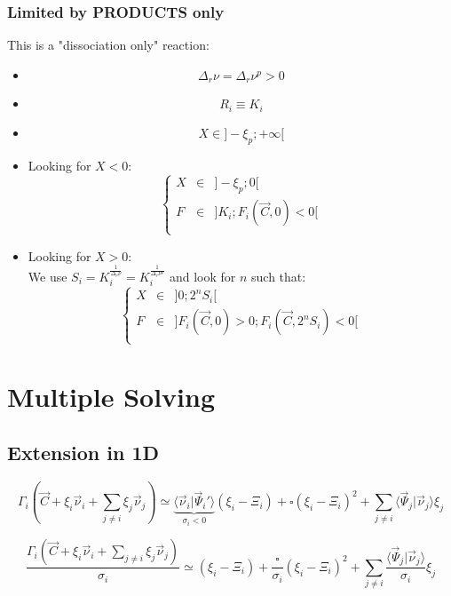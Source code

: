 \documentclass[aps,12pt]{revtex4}
\begin{document}
\subsubsection{Limited by PRODUCTS only}
This is a "dissociation only" reaction:
\begin{itemize}
\item
$$
	\Delta_r \nu =  \Delta_r \nu^p > 0 
$$
\item
$$
	R_i \equiv K_i
$$
\item
$$
	X \in \rbrack -\xi_p; +\infty \lbrack
$$
\item Looking for $X<0$:
$$
 \left\lbrace
 \begin{array}{rcl}
 	X &\in& \rbrack -\xi_p; 0 \lbrack\\
	F &\in& \rbrack K_i; F_i(\vec{C},0)<0 \lbrack\\
\end{array}
\right.
$$
\item Looking for $X>0$:\\
 We use $S_i=K_i^{\frac{1}{\Delta_r \nu}}=K_i^{\frac{1}{\Delta_r \nu^p}}$
 and look for $n$ such that:
 $$
 	\left\lbrace
 \begin{array}{rcl}
 	X &\in& \rbrack 0; 2^n S_i\lbrack\\
	F &\in& \rbrack F_i(\vec{C},0)>0; F_i(\vec{C},2^nS_i)<0 \lbrack\\
\end{array}
\right.
 $$



\end{itemize}
	
	
\section{Multiple Solving}

\subsection{Extension in 1D}

\begin{equation}
	\Gamma_i\left(\vec{C}+\xi_i \vec{\nu}_i  + \sum_{j\not= i} \xi_j \vec{\nu}_j \right) 	\simeq 
	\underbrace{\langle \vec{\nu}_i \vert \vec{\Psi}_i' \rangle}_{\sigma_i<0} (\xi_i-\Xi_i) + \square   (\xi_i-\Xi_i)^2
	+ \sum_{j\not=i}  \langle \vec{\Psi}_j \vert \vec{\nu}_j \rangle \xi_j
\end{equation}

\begin{equation}
	\dfrac{\Gamma_i\left(\vec{C}+\xi_i \vec{\nu}_i  + \sum_{j\not= i} \xi_j \vec{\nu}_j \right) }{\sigma_i}  \simeq
	\left(\xi_i - \Xi_i\right) + \dfrac{\square}{\sigma_i}\left(\xi_i - \Xi_i\right)^2 + \sum_{j\not=i}  \dfrac{\langle \vec{\Psi}_j \vert \vec{\nu}_j \rangle}{\sigma_i} \xi_j
\end{equation}
\end{document}
